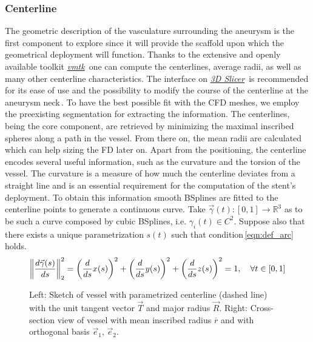 \subsubsection*{Centerline}
The geometric description of the vasculature surrounding the aneurysm is the first component to explore since it will provide the scaffold upon which the geometrical deployment will function. Thanks to the extensive and openly available toolkit \href{http://www.vmtk.org/}{\textit{vmtk}}\,\cite{Antiga2008, Izzo2018} one can compute the centerlines, average radii, as well as many other centerline characteristics. The interface on \href{https://www.slicer.org/}{\textit{3D Slicer}}\,\cite{Kikinis2014} is recommended for its ease of use and the possibility to modify the course of the centerline at the aneurysm neck\,\cite{Fedorov2012}. To have the best possible fit with the CFD meshes, we employ the preexisting segmentation for extracting the information. The centerlines, being the core component, are retrieved by minimizing the maximal inscribed spheres along a path in the vessel. From there on, the mean radii are calculated which can help sizing the FD later on. Apart from the positioning, the centerline encodes several useful information, such as the curvature and the torsion of the vessel. The curvature is a measure of how much the centerline deviates from a straight line and is an essential requirement for the computation of the stent's deployment. To obtain this information smooth BSplines are fitted to the centerline points to generate a continuous curve. Take $\vec\gamma(t):[0,1]\rightarrow\mathbb{R}^3$ as to be such a curve composed by cubic BSplines, i.e. $\gamma_{i}(t)\in C^2$. Suppose also that there exists a unique parametrization $s(t)$ such that condition\,\ref{eqn:def_arc} holds.
\begin{equation}
	\left\lVert\frac{d\vec{\gamma}(s)}{ds}\right\rVert_2^2 = {\left(\frac{d}{ds}x(s)\right)}^2 + {\left(\frac{d}{ds}y(s)\right)}^2 + {\left(\frac{d}{ds}z(s)\right)}^2 = 1,\quad\forall t\in[0,1]
	\label{eqn:def_arc}
\end{equation}
\begin{figure}[htb]
	\centering
	
	\vspace*{-0.5cm}
	\caption[Centerline sketch]{Left: Sketch of vessel with parametrized centerline (dashed line) with the unit tangent vector $\vec{T}$ and major radius $\vec{R}$. Right: Cross-section view of vessel with mean inscribed radius $\overline{r}$ and with orthogonal basis $\vec{e}_1,\,\vec{e}_2$.}
\end{figure}
